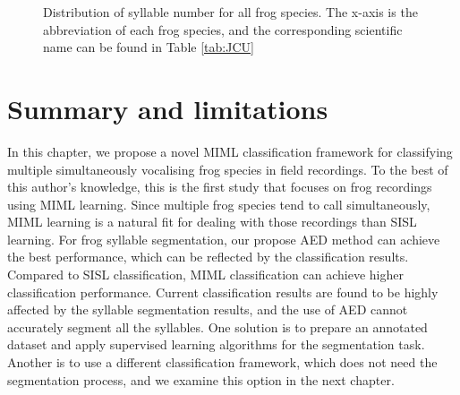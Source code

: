 \begin{figure}[htb!] %
\caption[Distribution of syllable number for all frog species]{Distribution of syllable number for all frog species. The x-axis is the abbreviation of each frog species, and the corresponding scientific name can be found in Table \ref{tab:JCU}}
\label{fig:Ch6_syllable} 
\end{figure}

\section{Summary and limitations}
In this chapter, we propose a novel MIML classification framework for classifying multiple simultaneously vocalising frog species in field recordings. To the best of this author's knowledge, this is the first study that focuses on frog recordings using MIML learning. Since multiple frog species tend to call simultaneously, MIML learning is a natural fit for dealing with those recordings than SISL learning. For frog syllable segmentation, our propose AED method can achieve the best performance, which can be reflected by the classification results. Compared to SISL classification, MIML classification can achieve higher classification performance. Current classification results are found to be highly affected by the syllable segmentation results, and the use of AED cannot accurately segment all the syllables. One solution is to prepare an annotated dataset and apply supervised learning algorithms for the segmentation task. Another is to use a different classification framework, which does not need the segmentation process, and we examine this option in the next chapter.


